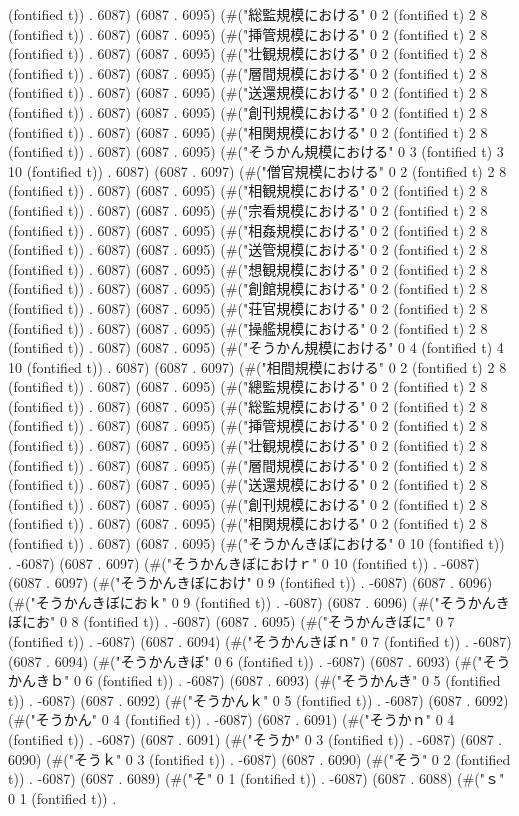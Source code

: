 (fontified t)) . 6087) (6087 . 6095) (#("総監規模における" 0 2 (fontified t) 2 8 (fontified t)) . 6087) (6087 . 6095) (#("挿管規模における" 0 2 (fontified t) 2 8 (fontified t)) . 6087) (6087 . 6095) (#("壮観規模における" 0 2 (fontified t) 2 8 (fontified t)) . 6087) (6087 . 6095) (#("層間規模における" 0 2 (fontified t) 2 8 (fontified t)) . 6087) (6087 . 6095) (#("送還規模における" 0 2 (fontified t) 2 8 (fontified t)) . 6087) (6087 . 6095) (#("創刊規模における" 0 2 (fontified t) 2 8 (fontified t)) . 6087) (6087 . 6095) (#("相関規模における" 0 2 (fontified t) 2 8 (fontified t)) . 6087) (6087 . 6095) (#("そうかん規模における" 0 3 (fontified t) 3 10 (fontified t)) . 6087) (6087 . 6097) (#("僧官規模における" 0 2 (fontified t) 2 8 (fontified t)) . 6087) (6087 . 6095) (#("相観規模における" 0 2 (fontified t) 2 8 (fontified t)) . 6087) (6087 . 6095) (#("宗看規模における" 0 2 (fontified t) 2 8 (fontified t)) . 6087) (6087 . 6095) (#("相姦規模における" 0 2 (fontified t) 2 8 (fontified t)) . 6087) (6087 . 6095) (#("送管規模における" 0 2 (fontified t) 2 8 (fontified t)) . 6087) (6087 . 6095) (#("想観規模における" 0 2 (fontified t) 2 8 (fontified t)) . 6087) (6087 . 6095) (#("創館規模における" 0 2 (fontified t) 2 8 (fontified t)) . 6087) (6087 . 6095) (#("荘官規模における" 0 2 (fontified t) 2 8 (fontified t)) . 6087) (6087 . 6095) (#("操艦規模における" 0 2 (fontified t) 2 8 (fontified t)) . 6087) (6087 . 6095) (#("そうかん規模における" 0 4 (fontified t) 4 10 (fontified t)) . 6087) (6087 . 6097) (#("相間規模における" 0 2 (fontified t) 2 8 (fontified t)) . 6087) (6087 . 6095) (#("總監規模における" 0 2 (fontified t) 2 8 (fontified t)) . 6087) (6087 . 6095) (#("総監規模における" 0 2 (fontified t) 2 8 (fontified t)) . 6087) (6087 . 6095) (#("挿管規模における" 0 2 (fontified t) 2 8 (fontified t)) . 6087) (6087 . 6095) (#("壮観規模における" 0 2 (fontified t) 2 8 (fontified t)) . 6087) (6087 . 6095) (#("層間規模における" 0 2 (fontified t) 2 8 (fontified t)) . 6087) (6087 . 6095) (#("送還規模における" 0 2 (fontified t) 2 8 (fontified t)) . 6087) (6087 . 6095) (#("創刊規模における" 0 2 (fontified t) 2 8 (fontified t)) . 6087) (6087 . 6095) (#("相関規模における" 0 2 (fontified t) 2 8 (fontified t)) . 6087) (6087 . 6095) (#("そうかんきぼにおける" 0 10 (fontified t)) . -6087) (6087 . 6097) (#("そうかんきぼにおけｒ" 0 10 (fontified t)) . -6087) (6087 . 6097) (#("そうかんきぼにおけ" 0 9 (fontified t)) . -6087) (6087 . 6096) (#("そうかんきぼにおｋ" 0 9 (fontified t)) . -6087) (6087 . 6096) (#("そうかんきぼにお" 0 8 (fontified t)) . -6087) (6087 . 6095) (#("そうかんきぼに" 0 7 (fontified t)) . -6087) (6087 . 6094) (#("そうかんきぼｎ" 0 7 (fontified t)) . -6087) (6087 . 6094) (#("そうかんきぼ" 0 6 (fontified t)) . -6087) (6087 . 6093) (#("そうかんきｂ" 0 6 (fontified t)) . -6087) (6087 . 6093) (#("そうかんき" 0 5 (fontified t)) . -6087) (6087 . 6092) (#("そうかんｋ" 0 5 (fontified t)) . -6087) (6087 . 6092) (#("そうかん" 0 4 (fontified t)) . -6087) (6087 . 6091) (#("そうかｎ" 0 4 (fontified t)) . -6087) (6087 . 6091) (#("そうか" 0 3 (fontified t)) . -6087) (6087 . 6090) (#("そうｋ" 0 3 (fontified t)) . -6087) (6087 . 6090) (#("そう" 0 2 (fontified t)) . -6087) (6087 . 6089) (#("そ" 0 1 (fontified t)) . -6087) (6087 . 6088) (#("ｓ" 0 1 (fontified t)) . 